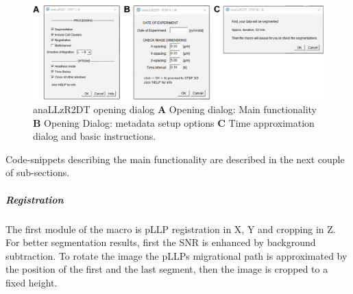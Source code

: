 \documentclass[11pt,singlespacinge,twoside]{reedthesis} %
\theoremstyle{definition}
\theoremstyle{definition}
\theoremstyle{definition}
\theoremstyle{remark}
\begin{document}
\begin{figure}[H]

{\centering \includegraphics[width=0.95\linewidth]{figures/materials/macros/anallzr2DT_macro} 

}

\caption[anaLLzR2DT opening dialog]{anaLLzR2DT opening dialog \textbf{A} Opening dialog: Main functionality \textbf{B} Opening Dialog: metadata setup options \textbf{C} Time approximation dialog and basic instructions.}\label{fig:anallzr2dtdialog}
\end{figure}
Code-snippets describing the main functionality are described in the next couple of sub-sections.

\hypertarget{registration}{%
\subparagraph{Registration}\label{registration}}

The first module of the macro is pLLP registration in X, Y and cropping in Z. For better segmentation results, first the SNR is enhanced by background subtraction. To rotate the image the pLLPs migrational path is approximated by the position of the first and the last segment, then the image is cropped to a fixed height.
\end{document}
